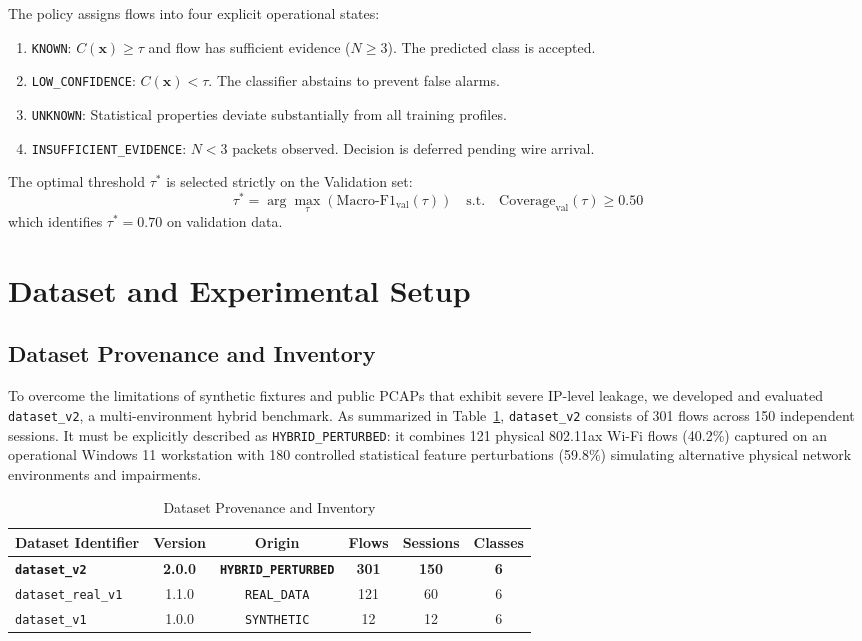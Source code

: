 \documentclass[conference]{IEEEtran}
\begin{document}
The policy assigns flows into four explicit operational states:
\begin{enumerate}
    \item \texttt{KNOWN}: $C(\mathbf{x}) \ge \tau$ and flow has sufficient evidence ($N \ge 3$). The predicted class is accepted.
    \item \texttt{LOW\_CONFIDENCE}: $C(\mathbf{x}) < \tau$. The classifier abstains to prevent false alarms.
    \item \texttt{UNKNOWN}: Statistical properties deviate substantially from all training profiles.
    \item \texttt{INSUFFICIENT\_EVIDENCE}: $N < 3$ packets observed. Decision is deferred pending wire arrival.
\end{enumerate}
The optimal threshold $\tau^*$ is selected strictly on the Validation set:
\begin{equation}
    \tau^* = \arg\max_{\tau} \left( \text{Macro-F1}_{\text{val}}(\tau) \right) \quad \text{s.t.} \quad \text{Coverage}_{\text{val}}(\tau) \ge 0.50
\end{equation}
which identifies $\tau^* = 0.70$ on validation data.

\section{Dataset and Experimental Setup}
\label{sec:dataset}

\subsection{Dataset Provenance and Inventory}
To overcome the limitations of synthetic fixtures and public PCAPs that exhibit severe IP-level leakage, we developed and evaluated \texttt{dataset\_v2}, a multi-environment hybrid benchmark. As summarized in Table~\ref{tab:dataset_summary}, \texttt{dataset\_v2} consists of 301 flows across 150 independent sessions. It must be explicitly described as \texttt{HYBRID\_PERTURBED}: it combines 121 physical 802.11ax Wi-Fi flows (40.2\%) captured on an operational Windows 11 workstation with 180 controlled statistical feature perturbations (59.8\%) simulating alternative physical network environments and impairments.

\begin{table}[t]
\centering
\caption{Dataset Provenance and Inventory}
\label{tab:dataset_summary}
\footnotesize
\begin{tabularx}{\columnwidth}{lccccc}
\toprule
\textbf{Dataset Identifier} & \textbf{Version} & \textbf{Origin} & \textbf{Flows} & \textbf{Sessions} & \textbf{Classes} \\
\midrule
\textbf{\texttt{dataset\_v2}} & \textbf{2.0.0} & \textbf{\texttt{HYBRID\_PERTURBED}} & \textbf{301} & \textbf{150} & \textbf{6} \\
\texttt{dataset\_real\_v1} & 1.1.0 & \texttt{REAL\_DATA} & 121 & 60 & 6 \\
\texttt{dataset\_v1} & 1.0.0 & \texttt{SYNTHETIC} & 12 & 12 & 6 \\
\bottomrule
\end{tabularx}
\end{table}
\end{document}
